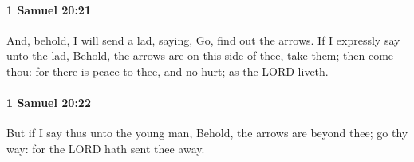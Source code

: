 		\paragraph{1 Samuel 20:21} %
			\label{1SAMUEL-20-21}

			And, behold, I will send a lad, saying, Go, find out the arrows. If I expressly say unto the lad, Behold, the arrows are on this side of thee, take them; then come thou: for there is peace to thee, and no hurt; as the LORD liveth.


		\paragraph{1 Samuel 20:22} %
			\label{1SAMUEL-20-22}

			But if I say thus unto the young man, Behold, the arrows are beyond thee; go thy way: for the LORD hath sent thee away.


